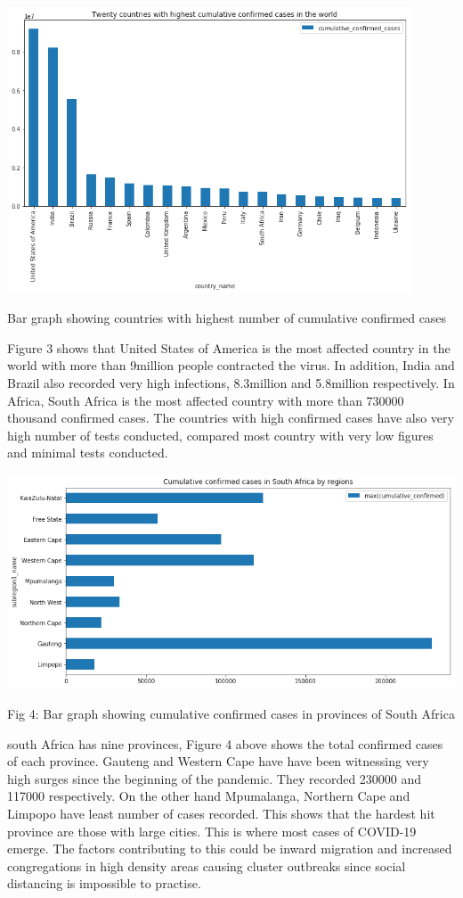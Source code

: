 \documentclass[12pt]{article}
\begin{document}
\includegraphics[width=0.9\textwidth, inner]{bar1.png}
\caption{Bar graph showing countries with highest number of cumulative confirmed cases}


Figure 3 shows that United States of America is the most affected country in the world with more than 9million people contracted the virus. In addition, India and Brazil also recorded very high infections, 8.3million and 5.8million respectively. In Africa, South Africa is the most affected country with more than 730000 thousand confirmed cases. The countries with high confirmed cases have also very high number of tests conducted, compared most country with very low figures and minimal tests conducted. 


\includegraphics[width=0.9\linewidth, inner]{bar2.png}
\caption{Fig 4: Bar graph showing cumulative confirmed cases in provinces of South Africa }

south Africa has nine provinces, Figure 4 above shows the total confirmed cases of each province. Gauteng and Western Cape have have been witnessing very high surges since the beginning of the pandemic. They recorded 230000 and 117000 respectively. On the other hand Mpumalanga, Northern Cape and Limpopo have least number of cases recorded. This shows that the hardest hit province are those with large cities. This is where most cases  of COVID-19 emerge. The factors contributing to this could be inward migration and increased congregations in high density areas causing cluster outbreaks since social distancing is impossible to practise. 
\end{document}
